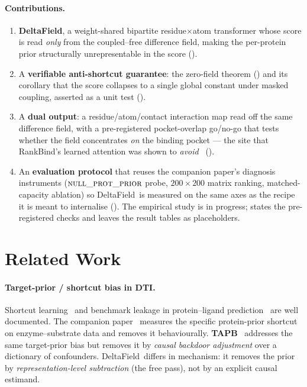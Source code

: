 \documentclass[11pt,a4paper]{article}
\newcommand{\df}{DeltaField\xspace}
\newcommand{\method}{RankBind\xspace}
\newcommand{\nullprior}{\textsc{null\_prot\_prior}\xspace}
\begin{document}
\paragraph{Contributions.}
\begin{enumerate}[leftmargin=*,itemsep=0pt,topsep=2pt]
  \item \textbf{\df}, a weight-shared bipartite residue$\times$atom
        transformer whose score is read \emph{only} from the coupled--free
        difference field, making the per-protein prior structurally
        unrepresentable in the score ().
  \item A \textbf{verifiable anti-shortcut guarantee}: the zero-field theorem
        () and its corollary that the score collapses to
        a single global constant under masked coupling, asserted as a unit
        test ().
  \item A \textbf{dual output}: a residue/atom/contact interaction map read
        off the same difference field, with a pre-registered pocket-overlap
        go/no-go that tests whether the field concentrates \emph{on} the
        binding pocket --- the site that \method's learned attention was
        shown to \emph{avoid}~\citep{manitz2026rankbind} ().
  \item An \textbf{evaluation protocol} that reuses the companion paper's
        diagnosis instruments ($\nullprior$ probe, $200\times200$ matrix
        ranking, matched-capacity ablation) so \df\ is measured on the same
        axes as the recipe it is meant to internalise (). The
        empirical study is in progress;  states the
        pre-registered checks and leaves the result tables as placeholders.
\end{enumerate}

\section{Related Work}
\label{sec:related}

\paragraph{Target-prior / shortcut bias in DTI.}
Shortcut learning~\citep{geirhos2020shortcut} and benchmark leakage in
protein--ligand prediction~\citep{wallach2018mostligands,kapoor2023leakage}
are well documented. The companion paper~\citep{manitz2026rankbind} measures
the specific protein-prior shortcut on enzyme--substrate data and removes it
behaviourally. \textbf{TAPB}~\citep{wang2025tapb} addresses the same
target-prior bias but removes it by \emph{causal backdoor adjustment} over a
dictionary of confounders. \df\ differs in mechanism: it removes the prior by
\emph{representation-level subtraction} (the free pass), not by an explicit
causal estimand.
\end{document}
